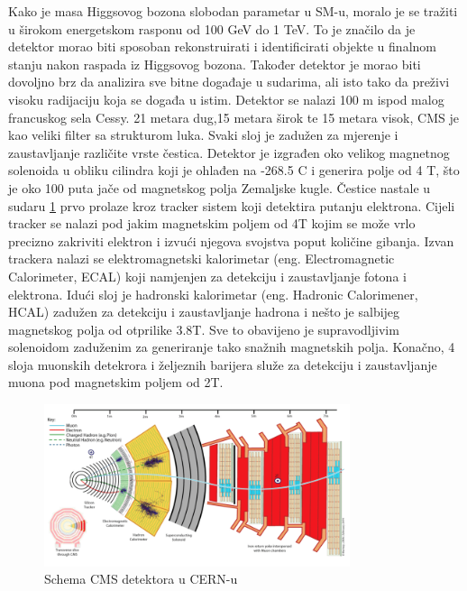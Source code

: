 \documentclass[12pt,a4paper,oneside]{article}
\begin{document}
\begin{linenumbers}
		Kako je masa Higgsovog bozona slobodan parametar u SM-u, moralo je se tražiti u širokom energetskom rasponu od 100 GeV do 1 TeV. To je značilo da je detektor morao biti sposoban rekonstruirati i identificirati objekte u finalnom stanju nakon raspada iz Higgsovog bozona. Također detektor je morao biti dovoljno brz da analizira sve bitne događaje u sudarima, ali isto tako da preživi visoku radijaciju koja se događa u istim.
		Detektor se nalazi 100 m ispod malog francuskog sela Cessy. 21 metara dug,15 metara širok te 15 metara visok, CMS je kao veliki filter sa strukturom luka. Svaki sloj je zadužen za mjerenje i zaustavljanje različite vrste čestica. Detektor je izgrađen oko velikog magnetnog solenoida u obliku cilindra koji je ohlađen na -268.5 \degree C i generira polje od 4 T, što je oko 100 puta jače od magnetskog polja Zemaljske kugle.
		Čestice nastale u sudaru  \ref{sl1:cms-scheme} prvo prolaze kroz tracker sistem koji detektira putanju elektrona. Cijeli tracker se nalazi pod jakim magnetskim poljem od 4T kojim se može vrlo precizno zakriviti elektron i izvući njegova svojstva poput količine gibanja. Izvan trackera nalazi se elektromagnetski kalorimetar (eng. Electromagnetic Calorimeter, ECAL) koji namjenjen za detekciju i zaustavljanje fotona i elektrona. Idući sloj je hadronski kalorimetar (eng. Hadronic Calorimener, HCAL) zadužen za detekciju i zaustavljanje hadrona i nešto je salbijeg magnetskog polja od otprilike 3.8T. Sve to obavijeno je supravodljivim solenoidom zaduženim za generiranje tako snažnih magnetskih polja. Konačno, 4 sloja muonskih detekrora i željeznih barijera služe za detekciju i zaustavljanje muona pod magnetskim poljem od 2T.
		\begin{figure}[h!]
			\centering
			\includegraphics[width=0.8\textwidth]{cms-scheme.png}
			\caption[Saturn viđen u ultraljubičastom svjetlu.]{\label{sl1:cms-scheme}Schema CMS detektora u CERN-u }
		\end{figure}
	

\end{linenumbers}
\end{document}
